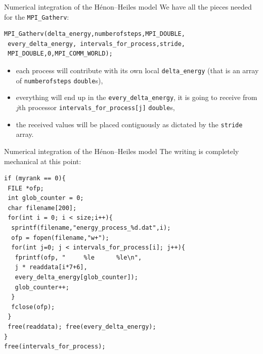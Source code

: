 \documentclass[xcolor={svgnames,usenames}]{beamer}
\begin{document}
\begin{frame}[fragile]{Numerical integration of the H\'enon--Heiles model}
We have all the pieces needed for the \texttt{MPI_Gatherv}:
\begin{verbatim}
MPI_Gatherv(delta_energy,numberofsteps,MPI_DOUBLE,
 every_delta_energy, intervals_for_process,stride,
 MPI_DOUBLE,0,MPI_COMM_WORLD);
\end{verbatim}
\begin{itemize}
	\item each process will contribute with its own local \texttt{delta_energy} (that is an array of \texttt{numberofsteps} \texttt{double}s),
	\item everything will end up in the \texttt{every_delta_energy}, it is going to receive from $j$th processor \texttt{intervals_for_process[j]} \texttt{double}s,
	\item the received values will be placed contiguously as dictated by the \texttt{stride} array.
\end{itemize}
\end{frame}

\begin{frame}[fragile]{Numerical integration of the H\'enon--Heiles model}
\small
The writing is completely mechanical at this point:
\begin{verbatim}
if (myrank == 0){
 FILE *ofp;
 int glob_counter = 0;
 char filename[200];
 for(int i = 0; i < size;i++){
  sprintf(filename,"energy_process_%d.dat",i);
  ofp = fopen(filename,"w+");
  for(int j=0; j < intervals_for_process[i]; j++){
   fprintf(ofp, "     %le      %le\n",
   j * readdata[i*7+6],
   every_delta_energy[glob_counter]);
   glob_counter++;
  }
  fclose(ofp);
 }
 free(readdata); free(every_delta_energy);
}
free(intervals_for_process);
\end{verbatim}
\end{frame}
\end{document}

